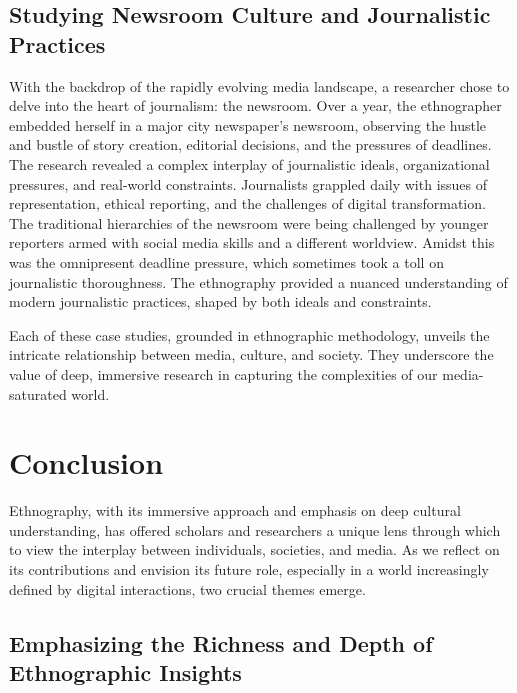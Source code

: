 \documentclass[
  b5paper]{book}
\begin{document}
\hypertarget{studying-newsroom-culture-and-journalistic-practices}{%
\subsection*{Studying Newsroom Culture and Journalistic Practices}\label{studying-newsroom-culture-and-journalistic-practices}}

With the backdrop of the rapidly evolving media landscape, a researcher chose to delve into the heart of journalism: the newsroom. Over a year, the ethnographer embedded herself in a major city newspaper's newsroom, observing the hustle and bustle of story creation, editorial decisions, and the pressures of deadlines. The research revealed a complex interplay of journalistic ideals, organizational pressures, and real-world constraints. Journalists grappled daily with issues of representation, ethical reporting, and the challenges of digital transformation. The traditional hierarchies of the newsroom were being challenged by younger reporters armed with social media skills and a different worldview. Amidst this was the omnipresent deadline pressure, which sometimes took a toll on journalistic thoroughness. The ethnography provided a nuanced understanding of modern journalistic practices, shaped by both ideals and constraints.

Each of these case studies, grounded in ethnographic methodology, unveils the intricate relationship between media, culture, and society. They underscore the value of deep, immersive research in capturing the complexities of our media-saturated world.

\hypertarget{conclusion-1}{%
\section{Conclusion}\label{conclusion-1}}

Ethnography, with its immersive approach and emphasis on deep cultural understanding, has offered scholars and researchers a unique lens through which to view the interplay between individuals, societies, and media. As we reflect on its contributions and envision its future role, especially in a world increasingly defined by digital interactions, two crucial themes emerge.

\hypertarget{emphasizing-the-richness-and-depth-of-ethnographic-insights}{%
\subsection*{Emphasizing the Richness and Depth of Ethnographic Insights}\label{emphasizing-the-richness-and-depth-of-ethnographic-insights}}
\end{document}
